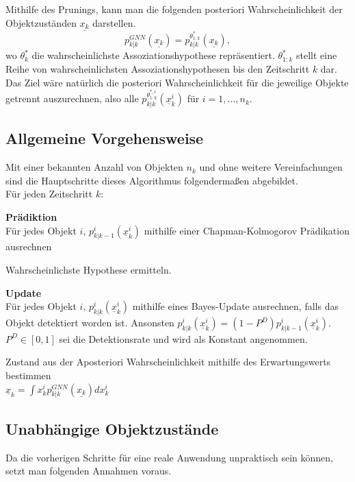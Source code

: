 \documentclass[10pt,a4paper]{article}
\begin{document}
Mithilfe des Prunings, kann man die folgenden posteriori Wahrscheinlichkeit der Objektzuständen $\underline{x_k}$ darstellen.
\begin{equation}
p_{k|k}^{GNN}(\underline{x_k}) = p_{k|k}^{\theta^*_{1:k}}(\underline{x_k}),
\end{equation} 
wo $\theta_k^*$ die wahrscheinlichste Assoziationshypothese repräsentiert. $\theta^*_{1:k}$ stellt eine Reihe von wahrscheinlichsten Assoziationshypothesen bis den Zeitschritt $k$ dar. Das Ziel wäre natürlich die posteriori Wahrscheinlichkeit für die jeweilige Objekte getrennt auszurechnen, also alle $p_{k|k}^{\theta^{*,i}_{1:k}}(\underline{x}_k^i)$ für $i = 1,...,n_k$.

\subsection{Allgemeine Vorgehensweise }
Mit einer bekannten Anzahl von Objekten $n_k$ und ohne weitere Vereinfachungen sind die Hauptschritte dieses Algorithmus folgendermaßen abgebildet.\\
Für jeden Zeitschritt $k$:\\
\begin{steps}\label{Stp:basicStepsGNN}
  \item \textbf{Prädiktion}\\
  Für jedes Objekt $i$, $p_{k|k-1}^{i}(\underline{x}_k^i)$  mithilfe einer Chapman-Kolmogorov Prädikation ausrechnen
  \item Wahrscheinlichste Hypothese ermitteln.
  \item \textbf{Update}\\
   Für jedes Objekt $i$, $p_{k|k}^{i}(\underline{x}_k^i)$  mithilfe eines Bayes-Update ausrechnen, falls das Objekt detektiert worden ist. Ansonsten $p_{k|k}^{i}(\underline{x}_k^i) = (1-P^D)p_{k|k-1}^{i}(\underline{x}_k^i)$. $P^D \in [0,1]$ sei die Detektionsrate und wird als Konstant angenommen.
   \item\label{step:erwartungsWert} Zustand aus der Aposteriori Wahrscheinlichkeit mithilfe des Erwartungswerts bestimmen \\
   $\underline{x}_k =  \int x_k^i p_{k|k}^{GNN}(\underline{x_k}) dx_k^i$
  
\end{steps}

\subsection{Unabhängige Objektzustände}
Da die vorherigen Schritte für eine reale Anwendung unpraktisch sein können, setzt man folgenden Annahmen voraus.
\end{document}
